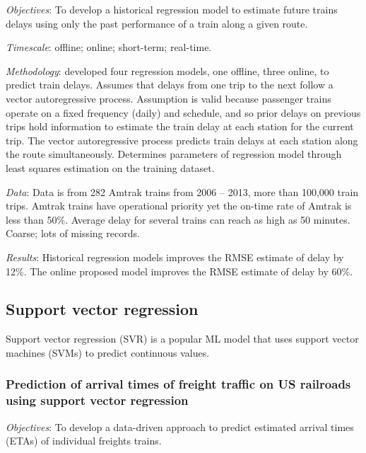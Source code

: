 \documentclass{article}
\begin{document}
\textit{Objectives}: To develop a historical regression model to estimate future trains delays using only the past performance of a train along a given route.

\smallskip

\textit{Timescale}: offline; online; short-term; real-time.

\smallskip

\textit{Methodology}: developed four regression models, one offline, three online, to predict train delays. Assumes that delays from one trip to the next follow a vector autoregressive process. Assumption is valid because passenger trains operate on a fixed frequency (daily) and schedule, and so prior delays on previous trips hold information to estimate the train delay at each station for the current trip. The vector autoregressive process predicts train delays at each station along the route simultaneously. Determines parameters of regression model through least squares estimation on the training dataset.

\smallskip

\textit{Data}: Data is from 282 Amtrak trains from 2006 – 2013, more than 100,000 train trips. Amtrak trains have operational priority yet the on-time rate of Amtrak is less than 50\%. Average delay for several trains can reach as high as 50 minutes. Coarse; lots of missing records. 

\smallskip

\textit{Results}: Historical regression models improves the RMSE estimate of delay by 12\%. The online proposed model improves the RMSE estimate of delay by 60\%.

\subsection{Support vector regression}

Support vector regression (SVR) is a popular ML model that uses support vector machines (SVMs) to predict continuous values. 

\subsubsection{Prediction of arrival times of freight traffic on US railroads using support vector regression \cite{barbour_et_al_2018}}

\textit{Objectives}: To develop a data-driven approach to predict estimated arrival times (ETAs) of individual freights trains. 
\end{document}
